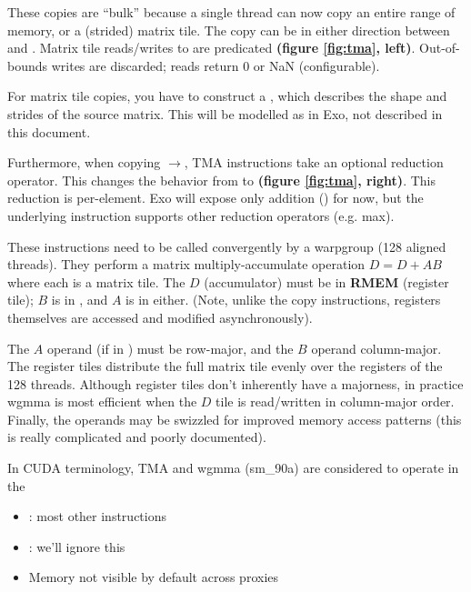 \filbreak
{}
These copies are ``bulk'' because a single thread can now copy an entire range of memory, or a (strided) matrix tile.
The copy can be in either direction between  and .
Matrix tile reads/writes to  are predicated \textbf{(figure \ref{fig:tma}, left)}.
Out-of-bounds writes are discarded; reads return 0 or NaN (configurable).

\filbreak
For matrix tile copies, you have to construct a , which describes the shape and strides of the source matrix.
This will be modelled as  in Exo, not described in this document.

\filbreak
Furthermore, when copying $\to$, TMA instructions take an optional reduction operator.
This changes the behavior from  to  \textbf{(figure \ref{fig:tma}, right)}.
This reduction is  per-element.
Exo will expose only addition (\lighttt{+=}) for now, but the underlying instruction supports other reduction operators (e.g. max).

\filbreak
{}
These instructions need to be called convergently by a warpgroup (128 aligned threads).
They perform a matrix multiply-accumulate operation $D = D + AB$ where each is a matrix tile.
The $D$ (accumulator) must be in \textbf{RMEM} (register tile); $B$ is in , and $A$ is in either.
(Note, unlike the copy instructions, registers themselves are accessed and modified asynchronously).

\filbreak
The $A$ operand (if in ) must be row-major, and the $B$ operand column-major.
The register tiles distribute the full matrix tile evenly over the registers of the 128 threads.
Although register tiles don't inherently have a majorness, in practice wgmma is most efficient when the $D$ tile is read/written in column-major order.
Finally, the  operands may be swizzled for improved memory access patterns (this is really complicated and poorly documented).

\filbreak
{}

In CUDA terminology, TMA and wgmma (sm\_90a) are considered to operate in the 
\begin{itemize}
  \item {}: most other instructions
  \item {}: we'll ignore this
  \item Memory not visible by default across proxies
\end{itemize}

